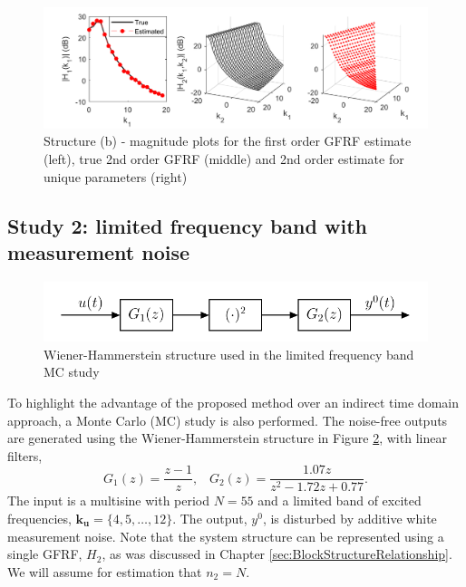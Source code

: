 \begin{figure}[!h]
\centering
\includegraphics[width = 1.05\textwidth]{Chapter8_GFRFs/HammersteinExampleEstimates_split.pdf}
\caption{Structure (b) - magnitude plots for the first order GFRF estimate (left), true 2nd order GFRF (middle) and 2nd order estimate for unique parameters (right)}
\label{fig:GFRF_Noisefree_estimates_b}
\end{figure}

\subsection{Study 2: limited frequency band with measurement noise}

\begin{figure}[!h]
\centering
\includegraphics[scale = 0.8]{Chapter8_GFRFs/WienerHamm_GFRFs.pdf}
\caption{Wiener-Hammerstein structure used in the limited frequency band MC study}
\label{fig:GFRF_WienerHammStructure}
\end{figure}

To highlight the advantage of the proposed method over an indirect time domain approach, a Monte Carlo (MC) study is also performed. The noise-free outputs are generated using the Wiener-Hammerstein structure in Figure \ref{fig:GFRF_WienerHammStructure}, with linear filters,
$$G_1(z) = \frac{z-1}{z}, \; \; \;  G_2(z) = \frac{1.07z}{z^2 - 1.72 z + 0.77}.$$
The input is a multisine with period $N=55$ and a limited band of excited frequencies, $\mathbf{k_u} = \{ 4,5,\hdots,12 \}$. The output, $y^0$, is disturbed by additive white measurement noise. Note that the system structure can be represented using a single GFRF, $H_2$, as was discussed in Chapter \ref{sec:BlockStructureRelationship}. We will assume for estimation that $n_2 = N$.   

